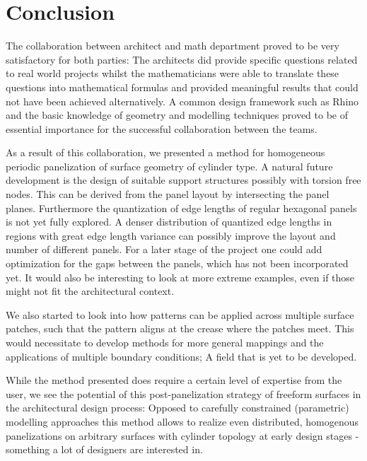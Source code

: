 \documentclass[article.tex]{subfiles}
\begin{document}
\section{Conclusion}
\label{sec:conclusion}

The collaboration between architect and math department proved to be
very satisfactory for both parties: The architects did provide
specific questions related to real world projects whilst the
mathematicians were able to translate these questions into
mathematical formulas and provided meaningful results that could not
have been achieved alternatively. A common design framework such as Rhino
and the basic knowledge of \nurbs geometry and modelling techniques
proved to be of essential importance for the successful collaboration
between the teams.

As a result of this collaboration, we presented a method for
homogeneous periodic panelization of \nurbs surface geometry of
cylinder type.  A natural future development is the design of suitable
support structures possibly with torsion free nodes. This can be
derived from the panel layout by intersecting the panel
planes. Furthermore the quantization of edge lengths of regular
hexagonal panels is not yet fully explored. A denser distribution of
quantized edge lengths in regions with great edge length variance can
possibly improve the layout and number of different panels. 
%
For a later stage of the project one could add optimization for the
gaps between the panels, which has not been incorporated yet. It would
also be interesting to look at more extreme examples, even if those
might not fit the architectural context.

We also started to look into how patterns can be applied across
multiple surface patches, such that the pattern aligns at the crease
where the patches meet. This would necessitate to develop methods for
more general mappings and the applications of multiple boundary
conditions; A field that is yet to be developed.

While the method presented does require a certain level of expertise
from the user, we see the potential of this post-panelization strategy
of freeform surfaces in the architectural design process: Opposed to
carefully constrained (parametric) modelling approaches this method
allows to realize even distributed, homogenous panelizations on
arbitrary surfaces with cylinder topology at early design stages -
something a lot of designers are interested in.


\subfilebibliography
\end{document}
